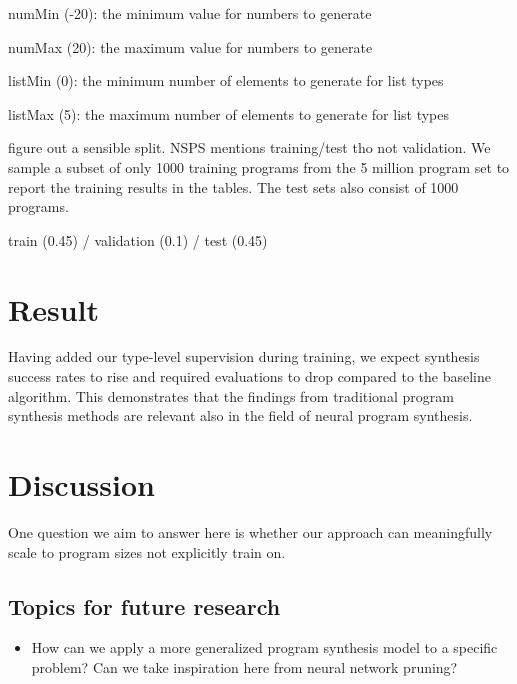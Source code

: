 \documentclass{article}
\begin{document}
numMin (-20): the minimum value for numbers to generate

numMax (20): the maximum value for numbers to generate

listMin (0): the minimum number of elements to generate for list types

listMax (5): the maximum number of elements to generate for list types

figure out a sensible split. NSPS mentions training/test tho not validation.
We sample a subset of only 1000 training programs from the 5 million program set to report the training results in the tables. The test sets also consist of 1000 programs.

train (0.45) / validation (0.1) / test (0.45)




\section{Result} %

Having added our type-level supervision during training, we expect synthesis success rates to rise and required evaluations to drop compared to the baseline algorithm.
This demonstrates that the findings from traditional program synthesis methods are relevant also in the field of neural program synthesis.



\section{Discussion} %

One question we aim to answer here is whether our approach can meaningfully scale to program sizes not explicitly train on.

\subsection{Topics for future research}
\begin{itemize}
    \item How can we apply a more generalized program synthesis model to a specific problem? Can we take inspiration here from neural network pruning?
\end{itemize}


\nocite{*}
% 

\end{document}

